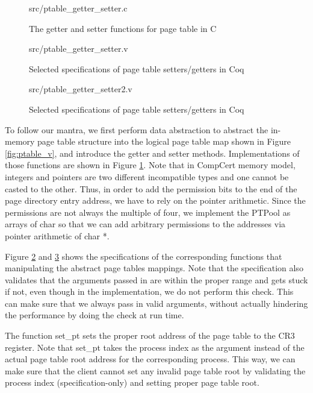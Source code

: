\begin{figure}
	 {src/ptable_getter_setter.c}
	\caption{The getter and setter functions for page table in C}
	\label{fig:ptable_getter_setter_c}
\end{figure}

\begin{figure}
	 {src/ptable_getter_setter.v}
	\caption{Selected specifications of page table setters/getters in Coq}
	\label{fig:ptable_getter_setter_v}
\end{figure}

\begin{figure}
	 {src/ptable_getter_setter2.v}
	\caption{Selected specifications of page table setters/getters in Coq}
	\label{fig:ptable_getter_setter2_v}
\end{figure}

To follow our mantra, we first perform data abstraction to abstract the in-memory
page table structure into the logical page table map shown in Figure \ref{fig:ptable_v},
and introduce the getter and setter methods.
Implementations of those functions are shown in Figure \ref{fig:ptable_getter_setter_c}.
Note that in CompCert memory model, integers and pointers are two different incompatible
types and one cannot be casted to the other. Thus, in order to add the permission bits
to the end of the page directory entry address, we have to rely on the pointer arithmetic.
Since the permissions are not always the multiple of four, we implement the \textsf{PTPool}
as arrays of \textsf{char} so that we can add arbitrary permissions to the addresses via
pointer arithmetic of \textsf{char *}.

Figure \ref{fig:ptable_getter_setter_v} and \ref{fig:ptable_getter_setter2_v} shows the
specifications of the corresponding functions that manipulating the abstract page tables mappings.
Note that the specification also validates that the arguments passed in are within the proper range
and gets stuck if not, even though in the implementation, we do not perform this check.
This can make sure that we always pass in valid arguments, without actually hindering the performance
by doing the check at run time.

The function \textsf{set\_pt} sets the proper root address of the page table to the
\textsf{CR3} register. Note that \textsf{set\_pt} takes the process index as the argument
instead of the actual page table root address for the corresponding process.
This way, we can make sure that the client cannot set any invalid page table root by validating
the process index (specification-only) and setting proper page table root.

